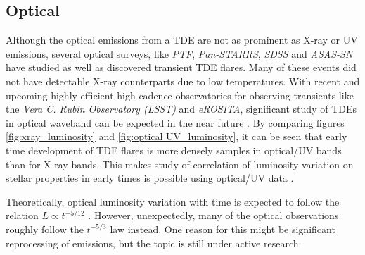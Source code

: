 \documentclass{tda}
\begin{document}
\subsection{Optical} \label{multiwave:optical}

Although the optical emissions from a TDE are not as prominent as X-ray or UV emissions, several optical surveys, like \textit{PTF}, \textit{Pan-STARRS}, \textit{SDSS} and \textit{ASAS-SN} have studied as well as discovered transient TDE flares. Many of these events did not have detectable X-ray counterparts due to low temperatures. With recent and upcoming highly efficient high cadence observatories for observing transients like the \textit{Vera C. Rubin Observatory (LSST)} and \textit{eROSITA}, significant study of TDEs in optical waveband can be expected in the near future \cite{strubbe_optical_2009}. By comparing figures \ref{fig:xray_luminosity} and \ref{fig:optical UV_luminosity}, it can be seen that early time development of TDE flares is more densely samples in optical/UV bands than for X-ray bands. This makes study of correlation of luminosity variation on stellar properties in early times is possible using optical/UV data \cite{gezari_tidal_2013}. 

Theoretically, optical luminosity variation with time is expected to follow the relation \(L \propto t^{-5/12}\) \cite{lodato_multiband_2011}. However, unexpectedly, many of the optical observations roughly follow the \(t^{-5/3}\) law instead. One reason for this might be significant reprocessing of emissions, but the topic is still under active research.
\end{document}
